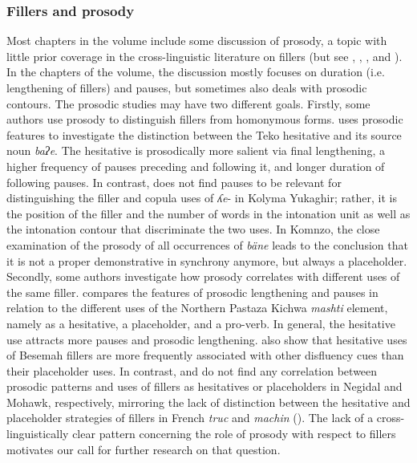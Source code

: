 \documentclass[output=paper]{langscibook}
\begin{document}
\subsubsection{Fillers and prosody}\label{sec:intro:9.3.1}
Most chapters in the volume include some discussion of prosody, a topic with little prior coverage in the cross-linguistic literature on fillers (but see \citealt{Dimock2010}, \citealt{Podlesskaya2022}, \citealt{Hennecke2022}, and \citealt{Vallejos-yopan2023}). In the chapters of the volume, the discussion mostly focuses on duration (i.e. lengthening of fillers) and pauses, but sometimes also deals with prosodic contours. The prosodic studies may have two different goals. Firstly, some authors use prosody to distinguish fillers from homonymous forms. \citeauthor{chapters/rose} uses prosodic features to investigate the distinction between the Teko hesitative and its source noun \textit{baʔe}. The hesitative is prosodically more salient via final lengthening, a higher frequency of pauses preceding and following it, and longer duration of following pauses. In contrast, \citeauthor{chapters/ventayol_boada} does not find pauses to be relevant for distinguishing the filler and copula uses of \textit{ʎe}- in Kolyma Yukaghir; rather, it is the position of the filler and the number of words in the intonation unit as well as the intonation contour that discriminate the two uses. In Komnzo, the close examination of the prosody of all occurrences of \textit{bäne} leads \citeauthor{chapters/doehler} to the conclusion that it is not a proper demonstrative in synchrony anymore, but always a placeholder. Secondly, some authors investigate how prosody correlates with different uses of the same filler. \citeauthor{chapters/rice} compares the features of prosodic lengthening and pauses in relation to the different uses of the Northern Pastaza Kichwa \textit{mashti} element, namely as a hesitative, a placeholder, and a pro-verb. In general, the hesitative use attracts more pauses and prosodic lengthening. \citeauthor{chapters/mcdonnell_billings} also show that hesitative uses of Besemah fillers are more frequently associated with other disfluency cues than their placeholder uses. In contrast, \citeauthor{chapters/pakendorf} and \citeauthor{chapters/mithun} do not find any correlation between prosodic patterns and uses of fillers as hesitatives or placeholders in Negidal and Mohawk, respectively, mirroring the lack of distinction between the hesitative and placeholder strategies of fillers in French \textit{truc} and \textit{machin} (\citealt{Hennecke2022}). The lack of a cross-linguistically clear pattern concerning the role of prosody with respect to fillers motivates our call for further research on that question. 
\end{document}
